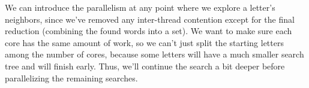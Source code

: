 \documentclass[fleqn]{article}
\begin{document}
    We can introduce the parallelism at any point where we explore a letter's neighbors, since we've removed any inter-thread contention except for the final reduction (combining the found words into a set).  We want to make sure each core has the same amount of work, so we can't just split the starting letters among the number of cores, because some letters will have a much smaller search tree and will finish early.  Thus, we'll continue the search a bit deeper before parallelizing the remaining searches.
\end{document}
